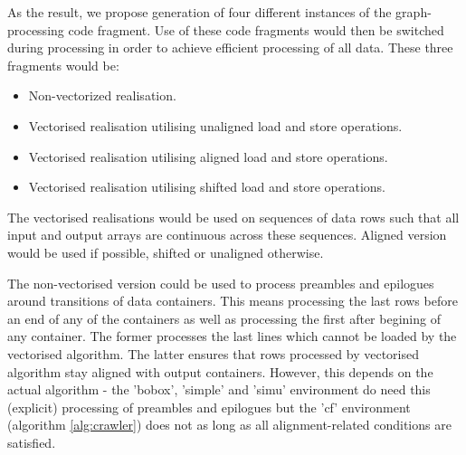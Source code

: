 As the result, we propose generation of four different instances of the graph-processing code fragment. Use of these code fragments would then be switched during processing in order to achieve efficient processing of all data. These three fragments would be:
\begin{itemize}
\item Non-vectorized realisation.
\item Vectorised realisation utilising unaligned load and store operations.
\item Vectorised realisation utilising aligned load and store operations.
\item Vectorised realisation utilising shifted load and store operations.
\end{itemize}

The vectorised realisations would be used on sequences of data rows such that all input and output arrays are continuous across these sequences. Aligned version would be used if possible, shifted or unaligned otherwise. 

The non-vectorised version could be used to process preambles and epilogues around transitions of data containers. This means processing the last  rows before an end of any of the containers as well as processing the first  after begining of any container. The former processes the last  lines which cannot be loaded by the vectorised algorithm. The latter ensures that rows processed by vectorised algorithm stay aligned with output containers. However, this depends on the actual algorithm - the 'bobox', 'simple' and 'simu' environment do need this (explicit) processing of preambles and epilogues but the 'cf' environment (algorithm \ref{alg:crawler}) does not as long as all alignment-related conditions are satisfied.


